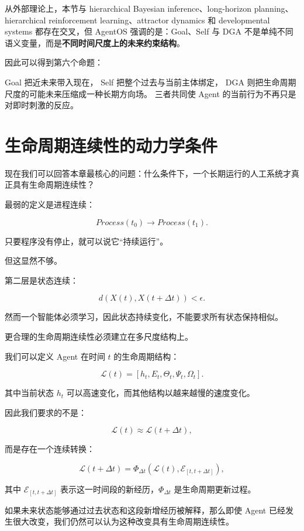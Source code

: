 从外部理论上，本节与 hierarchical Bayesian inference、long-horizon planning、hierarchical reinforcement learning、attractor dynamics 和 developmental systems 都存在交叉，但 AgentOS 强调的是：Goal、Self 与 DGA 不是单纯不同语义变量，而是\textbf{不同时间尺度上的未来约束结构}。

因此可以得到第六个命题：

\begin{proposition*}
Goal 把近未来带入现在，
Self 把整个过去与当前主体绑定，
DGA 则把生命周期尺度的可能未来压缩成一种长期方向场。
三者共同使 Agent 的当前行为不再只是对即时刺激的反应。
\end{proposition*}

\section{生命周期连续性的动力学条件}

现在我们可以回答本章最核心的问题：什么条件下，一个长期运行的人工系统才真正具有生命周期连续性？

最弱的定义是进程连续：

\[
Process(t_0)
\rightarrow
Process(t_1).
\]

只要程序没有停止，就可以说它“持续运行”。

但这显然不够。

第二层是状态连续：

\[
d
\left(
X(t),X(t+\Delta t)
\right)
<\epsilon.
\]

然而一个智能体必须学习，因此状态持续变化，不能要求所有状态保持相似。

更合理的生命周期连续性必须建立在多尺度结构上。

我们可以定义 Agent 在时间 $t$ 的生命周期结构：

\[
\mathcal{L}(t)
=
\left[
h_t,
E_t,
\Theta_t,
\Psi_t,
\Omega_t
\right].
\]

其中当前状态 $h_t$ 可以高速变化，而其他结构以越来越慢的速度变化。

因此我们要求的不是：

\[
\mathcal{L}(t)
\approx
\mathcal{L}(t+\Delta t),
\]

而是存在一个连续转换：

\[
\boxed{
\mathcal{L}(t+\Delta t)
=
\Phi_{\Delta t}
\left(
\mathcal{L}(t),
\mathcal{E}_{[t,t+\Delta t]}
\right),
}
\]

其中 $\mathcal{E}_{[t,t+\Delta t]}$ 表示这一时间段的新经历，$\Phi_{\Delta t}$ 是生命周期更新过程。

如果未来状态能够通过过去状态和这段新增经历被解释，那么即使 Agent 已经发生很大改变，我们仍然可以认为这种改变具有生命周期连续性。

